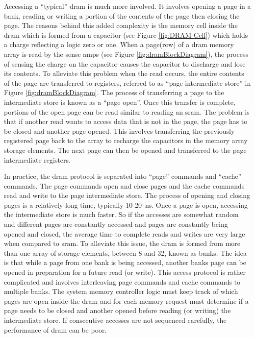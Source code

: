 Accessing a ``typical'' \ac{dram} is much more involved. It involves opening a page in a bank, reading or writing a portion of the contents of the page then closing the page. 
The reasons behind this added complexity is the memory cell inside the \ac{dram} which is formed from a capacitor (see Figure \ref{fig:DRAM Cell}) which holds a charge reflecting a logic zero or one. 
When a page(row) of a \ac{dram} memory array is read by the sense amps (see Figure \ref{fig:dramBlockDiagram}), the process of sensing the charge on the capacitor causes the capacitor to discharge and lose its contents. 
To alleviate this problem \iffalse \ac{dram} arrays are formed from a column of storage elements known as a page. \fi when the read occurs, the entire contents of the page are transferred to registers, referred to as ``page intermediate store'' in Figure \ref{fig:dramBlockDiagram}. 
The process of transferring a page to the intermediate store is known as a ``page open''.
Once this transfer is complete, portions of the open page can be read similar to reading an \ac{sram}. 
The problem is that if another read wants to access data that is not in the page, the page has to be closed and another page opened. 
This involves transferring the previously registered page back to the array to recharge the capacitors in the memory array storage elements. 
The next page can then be opened and transferred to the page intermediate registers.

In practice, the \ac{dram} protocol is separated into ``page'' commands and ``cache'' commands. The page commands open and close pages and the cache commands read and write to the page intermediate store.
The process of opening and closing pages is a relatively long time, typically 10-20\SI[per-mode=symbol]{}{\nano\second}. Once a page is open, accessing the intermediate store is much faster.
So if the accesses are somewhat random and different pages are constantly accessed and pages are constantly being opened and closed, the average time to complete reads and writes are very large when compared to \ac{sram}.
To alleviate this issue, the \ac{dram} is formed from more than one array of storage elements, between 8 and 32, known as banks. The idea is that while a page from one bank is being accessed, another banks page can be opened in preparation for a future read (or write).
This access protocol is rather complicated and involves interleaving page commands and cache commands to multiple banks. 
The system memory controller logic must keep track of which pages are open inside the \ac{dram} and for each memory request must determine if a page needs to be closed and another opened before reading (or writing) the intermediate store.
If consecutive accesses are not sequenced carefully, the performance of \ac{dram} can be poor.

